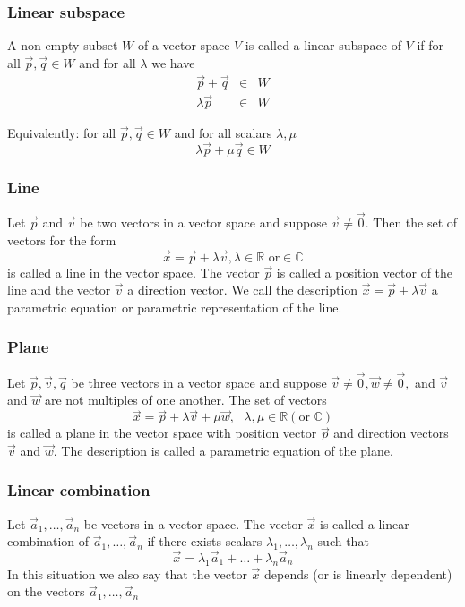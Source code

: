 \documentclass{article}
\begin{document}
			\subsubsection{Linear subspace}
			A non-empty subset $W$ of a vector space $V$ is called a linear subspace of $V$ if for all $\vec{p},\vec{q} \in W$ and for all $\lambda$ we have
			\begin{eqnarray*}
				\vec{p} + \vec{q} &\in& W\\
				\lambda\vec{p} &\in& W
			\end{eqnarray*}
		
			Equivalently: for all $\vec{p},\vec{q} \in W$ and for all scalars $\lambda, \mu$
			\begin{equation*}
				\lambda\vec{p} + \mu\vec{q} \in W
			\end{equation*}
			
			\subsubsection{Line}
			Let $\vec{p}$ and $\vec{v}$ be two vectors in a vector space and suppose $\vec{v} \neq \vec{0}$. Then the set of vectors for the form
			\begin{equation*}
				\vec{x} = \vec{p} + \lambda\vec{v}, \lambda \in \mathbb{R} \text{ or} \in \mathbb{C}
			\end{equation*}
			is called a line in the vector space. The vector $\vec{p}$ is called a position vector of the line and the vector $\vec{v}$ a direction vector. We call the description $\vec{x} = \vec{p} + \lambda\vec{v}$ a parametric equation or parametric representation of the line.
			
			\subsubsection{Plane}
			Let $\vec{p}, \vec{v}, \vec{q}$ be three vectors in a vector space and suppose $\vec{v} \neq \vec{0}, \vec{w} \neq \vec{0},$ and $\vec{v}$ and $\vec{w}$ are not multiples of one another. The set of vectors
			\begin{equation*}
				\vec{x} = \vec{p} + \lambda\vec{v}+ \mu\vec{w},\text{ } \lambda, \mu \in \mathbb{R} (\text{or }\mathbb{C})
			\end{equation*}
			is called a plane in the vector space with position vector $\vec{p}$ and direction vectors $\vec{v}$ and $\vec{w}$. The description is called a parametric equation of the plane.
			
			\subsubsection{Linear combination}
			Let $\vec{a}_1,\dots,\vec{a}_n$ be vectors in a vector space. The vector $\vec{x}$ is called a linear combination of $\vec{a}_1,\dots,\vec{a}_n$ if there exists scalars $\lambda_1,\dots,\lambda_n$ such that
			\begin{equation*}
				\vec{x} = \lambda_1\vec{a}_1 + \dots + \lambda_n\vec{a}_n
			\end{equation*}
			In this situation we also say that the vector $\vec{x}$ depends (or is linearly dependent) on the vectors $\vec{a}_1,\dots,\vec{a}_n$
			
\end{document}
